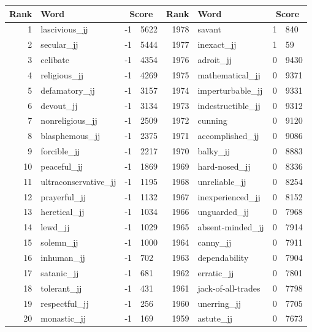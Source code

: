 \begin{table}[tbp]
    \begin{tabular}{| rlr@{.}l | rlr@{.}l |}
    \hline
    \textbf{Rank} & \textbf{Word} & \multicolumn{2}{c|}{\textbf{Score}} & \textbf{Rank} & \textbf{Word} & \multicolumn{2}{c|}{\textbf{Score}} \\
    \hline
    1 & lascivious\_jj & -1 & 5622    &    1978 & savant & 1 & 840 \\
    2 & secular\_jj & -1 & 5444    &    1977 & inexact\_jj & 1 & 59 \\
    3 & celibate & -1 & 4354    &    1976 & adroit\_jj & 0 & 9430 \\
    4 & religious\_jj & -1 & 4269    &    1975 & mathematical\_jj & 0 & 9371 \\
    5 & defamatory\_jj & -1 & 3157    &    1974 & imperturbable\_jj & 0 & 9331 \\
    6 & devout\_jj & -1 & 3134    &    1973 & indestructible\_jj & 0 & 9312 \\
    7 & nonreligious\_jj & -1 & 2509    &    1972 & cunning & 0 & 9120 \\
    8 & blasphemous\_jj & -1 & 2375    &    1971 & accomplished\_jj & 0 & 9086 \\
    9 & forcible\_jj & -1 & 2217    &    1970 & balky\_jj & 0 & 8883 \\
    10 & peaceful\_jj & -1 & 1869    &    1969 & hard-nosed\_jj & 0 & 8336 \\
    11 & ultraconservative\_jj & -1 & 1195    &    1968 & unreliable\_jj & 0 & 8254 \\
    12 & prayerful\_jj & -1 & 1132    &    1967 & inexperienced\_jj & 0 & 8152 \\
    13 & heretical\_jj & -1 & 1034    &    1966 & unguarded\_jj & 0 & 7968 \\
    14 & lewd\_jj & -1 & 1029    &    1965 & absent-minded\_jj & 0 & 7914 \\
    15 & solemn\_jj & -1 & 1000    &    1964 & canny\_jj & 0 & 7911 \\
    16 & inhuman\_jj & -1 & 702    &    1963 & dependability & 0 & 7904 \\
    17 & satanic\_jj & -1 & 681    &    1962 & erratic\_jj & 0 & 7801 \\
    18 & tolerant\_jj & -1 & 431    &    1961 & jack-of-all-trades & 0 & 7798 \\
    19 & respectful\_jj & -1 & 256    &    1960 & unerring\_jj & 0 & 7705 \\
    20 & monastic\_jj & -1 & 169    &    1959 & astute\_jj & 0 & 7673 \\

\end{tabular}
\end{table}
